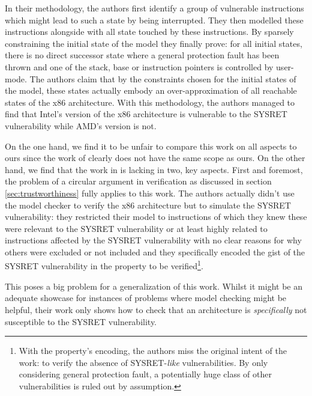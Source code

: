 In their methodology, the authors first identify a group of vulnerable instructions which might lead to such a state by being interrupted.
They then modelled these instructions alongside with all state touched by these instructions.
By sparsely constraining the initial state of the model they finally prove: for all initial states, there is no direct successor state where a general protection fault has been thrown and one of the stack, base or instruction pointers is controlled by user-mode.
The authors claim that by the constraints chosen for the initial states of the model, these states actually embody an over-approximation of all reachable states of the x86 architecture.
With this methodology, the authors managed to find that Intel's version of the x86 architecture is vulnerable to the SYSRET vulnerability while AMD's version is not.

On the one hand, we find it to be unfair to compare this work on all aspects to ours since the work of \citeauthor{BradfieldS16} clearly does not have the same scope as ours.
On the other hand, we find that the work in \cite{BradfieldS16} is lacking in two, key aspects.
First and foremost, the problem of a circular argument in verification as discussed in section \ref{sec:trustworthiness} fully applies to this work.
The authors actually didn't use the model checker to verify the x86 architecture but to simulate the SYSRET vulnerability: they restricted their model to instructions of which they knew these were relevant to the SYSRET vulnerability or at least highly related to instructions affected by the SYSRET vulnerability with no clear reasons for why others were excluded or not included and they specifically encoded the gist of the SYSRET vulnerability in the property to be verified\footnote{%
    With the property's encoding, the authors miss the original intent of the work: to verify the absence of SYSRET-\textit{like} vulnerabilities.
    By only considering general protection fault, a potentially huge class of other vulnerabilities is ruled out by assumption.
}.

This poses a big problem for a generalization of this work.
Whilst it might be an adequate showcase for instances of problems where model checking might be helpful, their work only shows how to check that an architecture is \textit{specifically} not susceptible to the SYSRET vulnerability.

